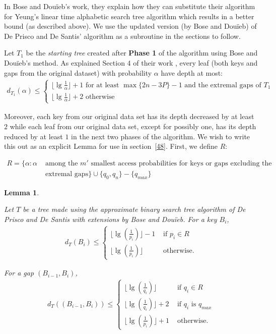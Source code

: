 \documentclass[letterpaper,12pt,titlepage,oneside,final]{book}
\theoremstyle{plain}
\newtheorem{lem}[thm]{Lemma}
\begin{document}
In Bose and Dou\"{i}eb's work, they explain how they can substitute their algorithm for Yeung's linear time alphabetic search tree algorithm which results in a better bound (as described above). We use the updated version (by Bose and Dou\"{i}eb) of De Prisco and De Santis' algorithm as a subroutine in the sections to follow.

Let $T_1$ be the \textit{starting tree} created after \textbf{Phase 1} of the algorithm using Bose and Dou\"{i}eb's method. As explained Section 4 of their work \cite{bose2009efficient}, every leaf (both keys and gaps from the original dataset) with probability $\alpha$ have depth at most:
\begin{align*}
d_{T_1}(\alpha) \leq
\begin{cases}
\lfloor \lg \frac{1}{\alpha} \rfloor + 1 \text{ for at least } \max\{2n-3P\}-1 \text{ and the extremal gaps of } T_1 \\
\lfloor \lg \frac{1}{\alpha} \rfloor + 2 \text{ otherwise}
\end{cases}
\end{align*}

Moreover, each key from our original data set has its depth decreased by at least $2$ while each leaf from our original data set, except for possibly one, has its depth reduced by at least $1$ in the next two phases of the algorithm. We wish to write this out as an explicit Lemma for use in section~\ref{48}. First, we define $R$:

\begin{align*}
R = \{\alpha : \alpha &\text{ among the }m' \text{ smallest access probabilities for keys or gaps excluding the} \\
&\text{ extremal gaps} \} \cup \{q_0, q_n\} - \{q_{max}\}
\end{align*}

\begin{lem} \label{ApprBSTLem}

Let $T$ be a tree made using the approximate binary search tree algorithm of De Prisco and De Santis with extensions by Bose and Dou\"{i}eb. For a key $B_i$,
\begin{align*} 
d_T(B_i) \leq
\begin{cases}  
\lfloor \lg(\frac{1}{p_i}) \rfloor - 1 &\text{ if } p_i \in R  \\
\lfloor \lg(\frac{1}{p_i}) \rfloor &\text{ otherwise.}
\end{cases}
\end{align*}

For a gap $(B_{i-1},B_i)$,
\begin{align*}
d_T((B_{i-1},B_i)) \leq
\begin{cases}  
\lfloor \lg(\frac{1}{q_i}) \rfloor &\text{ if } q_i \in R  \\
\lfloor \lg(\frac{1}{q_i}) \rfloor + 2 &\text{ if } q_i \text{ is } q_{max} \\
\lfloor \lg(\frac{1}{p_i}) \rfloor + 1 &\text{ otherwise.}
\end{cases}
\end{align*}
  
\end{lem}
\end{document}

